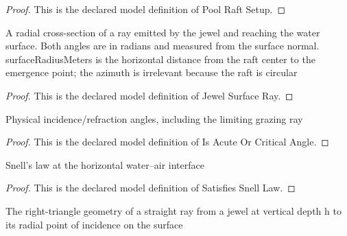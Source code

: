 \begin{proof}
  This is the declared model definition of Pool Raft Setup.
\end{proof}
\begin{definition}
  \label{def:physics:phyx-mini-0015:phyxminiproblems-problemphyxmini0015-jewelsurfaceray}
  A radial cross-section of a ray emitted by the jewel and reaching the water surface. Both angles are in radians and measured from the surface normal. surfaceRadiusMeters is the horizontal distance from the raft center to the emergence point; the azimuth is irrelevant because the raft is circular
\end{definition}
\begin{proof}
  This is the declared model definition of Jewel Surface Ray.
\end{proof}
\begin{definition}
  \label{def:physics:phyx-mini-0015:phyxminiproblems-problemphyxmini0015-isacuteorcriticalangle}
  Physical incidence/refraction angles, including the limiting grazing ray
\end{definition}
\begin{proof}
  This is the declared model definition of Is Acute Or Critical Angle.
\end{proof}
\begin{definition}
  \label{def:physics:phyx-mini-0015:phyxminiproblems-problemphyxmini0015-satisfiessnelllaw}
  Snell's law at the horizontal water--air interface
\end{definition}
\begin{proof}
  This is the declared model definition of Satisfies Snell Law.
\end{proof}
\begin{definition}
  \label{def:physics:phyx-mini-0015:phyxminiproblems-problemphyxmini0015-satisfiesjewelraygeometry}
  The right-triangle geometry of a straight ray from a jewel at vertical depth h to its radial point of incidence on the surface
\end{definition}
